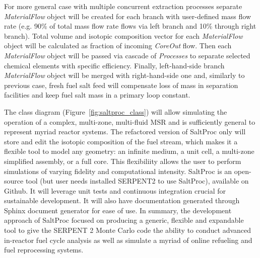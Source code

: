 For more general case with multiple concurrent extraction processes separate 
\textit{MaterialFlow} object will be created for each branch with user-defined 
mass flow rate (e.g. 90\% of total mass flow rate flows via left branch and 
10\% through right branch). Total volume and isotopic composition vector 
for each \textit{MaterialFlow} object will be calculated as fraction of incoming 
\textit{CoreOut} flow. Then each \textit{MaterialFlow} object will be passed via 
cascade of \textit{Processes} to separate selected chemical elements with 
specific efficiency. Finally, left-hand-side branch \textit{MaterialFlow} object 
will be merged with right-hand-side one and, similarly to previous case, fresh 
fuel salt feed will compensate loss of mass in separation facilities and keep 
fuel salt mass in a primary loop constant.

The class diagram (Figure~\ref{fig:saltproc_class}) will allow simulating 
the operation of a complex, multi-zone, 
multi-fluid \gls{MSR} and is sufficiently general to represent myriad reactor 
systems. The refactored version of SaltProc only will store and edit the 
isotopic composition of the fuel stream, which makes it a flexible tool to 
model any geometry: an infinite medium, a unit cell, a multi-zone simplified 
assembly, or a full core. This flexibiliity allows the user to perform 
simulations of varying fidelity and computational intensity. SaltProc is an 
open-source tool (but user needs installed SERPENT2 to use SaltProc), 
available on Github. It will leverage unit tests and continuous integration 
crucial for sustainable development. It will also have documentation
generated through Sphinx document generator for ease of use. In summary, the 
development approach of SaltProc focused on producing a generic, flexible and 
expandable tool to give the SERPENT 2 Monte Carlo code the ability to conduct 
advanced in-reactor fuel cycle analysis as well as simulate a myriad of 
online refueling and fuel reprocessing systems.


